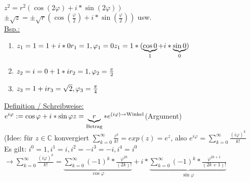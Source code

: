 \documentclass[a4paper,11pt]{article}
\begin{document}
\begin{enumerate}[label=\arabic*)]
	$z^2=r^2(\cos(2\varphi)+i*\sin(2\varphi))$ \\
	$\pm\sqrt{z}=\pm\sqrt{r}(\cos(\frac{\varphi}{2})+i*\sin(\frac{\varphi}{2}))$ usw. \\
	\underline{Bsp.:}
	\begin{enumerate}[label=\alph*)]
		\item $z_1=1=1+i*0 \\
		r_1=1,\varphi_1=0 \\
		z_1=1*(\underbrace{\cos0}_{1}+i*\underbrace{\sin0}_{0})$ 
		\item $z_2=i=0+1*i \\
		r_2=1,\varphi_2=\frac{\pi}{2}$
		\item $z_3=1+i \\
		r_3=\sqrt{2},\varphi_3=\frac{\pi}{4}$
	\end{enumerate}
	\underline{Definition / Schreibweise:} \\
	$e^{i\varphi}:=\cos\varphi+i*\sin\varphi \\
	z=\underbrace{r}_{\text{Betrag}}*e^{(i\varphi)\rightarrow\text{Winkel}}$(Argument) \\
	(Idee: für $z\in\mathbb{C}$ konvergiert $\sum_{k=0}^\infty\frac{z^k}{k!}=exp(z)=e^z$, also $e^{i\varphi}=\sum_{k=0}^\infty\frac{(i\varphi)^k}{k!}$ \\
	Es gilt: $i^0=1, i^1=i, i^2=-i^3=-i, i^4=i^0$ \\
	$\rightarrow\sum_{k=0}^\infty\frac{(i\varphi)^k}{k!}=\underbrace{\sum_{k=0}^\infty(-1)^k*\frac{\varphi^{2k}}{(2k)!}}_{\cos\varphi}+i*\underbrace{\sum_{k=0}^\infty(-1)^k*\frac{\varphi^{2k+1}}{(2k+1)!}}_{\sin\varphi}$
	
	\newpage
	

\end{enumerate}
\end{document}
